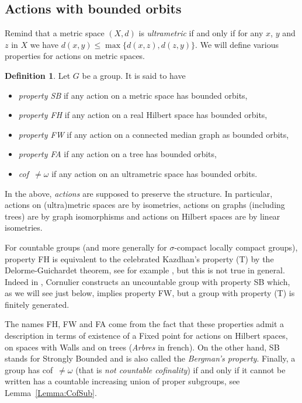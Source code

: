 \documentclass[a4paper]{article}
\theoremstyle{definition}
\newtheorem{defn}[lem]{Definition}
\begin{document}
\subsection{Actions with bounded orbits}
%
%
%
Remind that a metric space $(X,d)$ is \emph{ultrametric} if and only if for any $x$, $y$ and $z$ in $X$ we have $d(x,y)\leq\max\{d(x,z),d(z,y)\}$. We will define various properties for actions on metric spaces.
%
\begin{defn}\label{Def:FHFA}
Let $G$ be a group.
It is said to have
\begin{itemize}
\item\emph{property SB} if any action on a metric space has bounded orbits,
\item \emph{property FH} if any action on a real Hilbert space has bounded orbits,
\item
\emph{property FW} if any action on a connected median graph as bounded orbits,
\item
\emph{property FA} if any action on a tree has bounded orbits,
\item
\emph{cof~$\neq\omega$} if any action on an ultrametric space has bounded orbits.
\end{itemize}
In the above, \emph{actions} are supposed to preserve the structure. In particular, actions on (ultra)metric spaces are by isometries, actions on graphs (including trees) are by graph isomorphisms and actions on Hilbert spaces are by linear isometries.

\end{defn}
%
%
For countable groups (and more generally for $\sigma$-compact locally compact groups), property FH is equivalent to the celebrated Kazdhan's property (T) by the Delorme-Guichardet theorem, see for example \cite{MR2415834}, but this is not true in general. Indeed in \cite{MR2240370}, Cornulier constructs an uncountable group with property SB which, as we will see just below, implies property FW, but a group with property (T) is finitely generated.

The names FH, FW and FA come from the fact that these properties admit a description in terms of existence of a Fixed point for actions on Hilbert spaces, on spaces with Walls and on trees (\emph{Arbres} in french).
On the other hand, SB stands for Strongly Bounded and is also called the \emph{Bergman's property}.
Finally, a group has cof~$\neq\omega$ (that is \emph{not countable cofinality}) if and only if it cannot be written has a countable increasing union of proper subgroups, see Lemma~\ref{Lemma:CofSub}.
\end{document}
